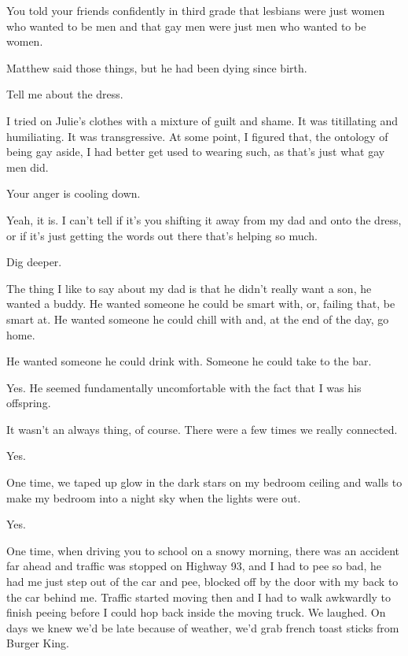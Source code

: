 \begin{paracol}{2}
\begin{leftcolumn}
\begin{ally}
You told your friends confidently in third grade that lesbians were just women who wanted to be men and that gay men were just men who wanted to be women.
\end{ally}
Matthew said those things, but he had been dying since birth.

\begin{ally}
Tell me about the dress.
\end{ally}
I tried on Julie's clothes with a mixture of guilt and shame. It was titillating and humiliating. It was transgressive. At some point, I figured that, the ontology of being gay aside, I had better get used to wearing such, as that's just what gay men did.

\begin{ally}
Your anger is cooling down.
\end{ally}
Yeah, it is. I can't tell if it's you shifting it away from my dad and onto the dress, or if it's just getting the words out there that's helping so much.

\begin{ally}
Dig deeper.
\end{ally}
\newpage

\noindent The thing I like to say about my dad is that he didn't really want a son, he wanted a buddy. He wanted someone he could be smart with, or, failing that, be smart at. He wanted someone he could chill with and, at the end of the day, go home.

\begin{ally}
He wanted someone he could drink with. Someone he could take to the bar.
\end{ally}
Yes. He seemed fundamentally uncomfortable with the fact that I was his offspring.

It wasn't an always thing, of course. There were a few times we really connected.

\begin{ally}
Yes.
\end{ally}
One time, we taped up glow in the dark stars on my bedroom ceiling and walls to make my bedroom into a night sky when the lights were out.

\begin{ally}
Yes.
\end{ally}
One time, when driving you to school on a snowy morning, there was an accident far ahead and traffic was stopped on Highway 93, and I had to pee so bad, he had me just step out of the car and pee, blocked off by the door with my back to the car behind me. Traffic started moving then and I had to walk awkwardly to finish peeing before I could hop back inside the moving truck. We laughed. On days we knew we'd be late because of weather, we'd grab french toast sticks from Burger King.


\end{leftcolumn}
\end{paracol}
